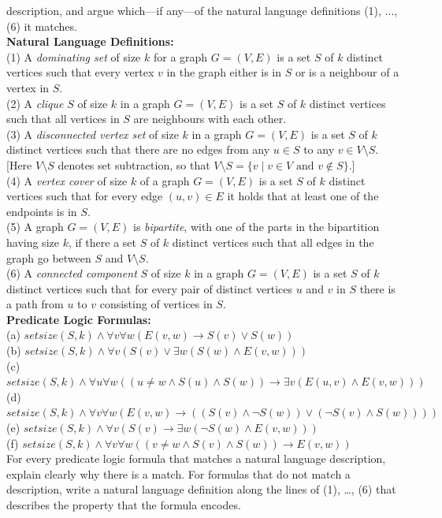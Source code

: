 \documentclass[a4paper,12pt]{article}
\begin{document}
{description, and argue which—if any—of the natural language definitions (1), $\ldots$, (6) it matches.\\
\n
\textbf{Natural Language Definitions:}\\
\n
(1) A \emph{dominating set} of size $k$ for a graph $G = (V, E)$ is a set $S$ of $k$ distinct vertices such that every vertex $v$ in the graph either is in $S$ or is a neighbour of a vertex in $S$.\\
\n
(2) A \emph{clique} $S$ of size $k$ in a graph $G = (V, E)$ is a set $S$ of $k$ distinct vertices such that all vertices in $S$ are neighbours with each other.\\
\n
(3) A \emph{disconnected vertex set} of size $k$ in a graph $G = (V, E)$ is a set $S$ of $k$ distinct vertices such that there are no edges from any $u \in S$ to any $v \in V \setminus S$. [Here $V \setminus S$ denotes set subtraction, so that $V \setminus S = \{v \mid v \in V \text{ and } v \not\in S\}$.]\\
\n
(4) A \emph{vertex cover} of size $k$ of a graph $G = (V, E)$ is a set $S$ of $k$ distinct vertices such that for every edge $(u, v) \in E$ it holds that at least one of the endpoints is in $S$.\\
\n
(5) A graph $G = (V, E)$ is \emph{bipartite}, with one of the parts in the bipartition having size $k$, if there a set $S$ of $k$ distinct vertices such that all edges in the graph go between $S$ and $V \setminus S$.\\
\n
(6) A \emph{connected component} $S$ of size $k$ in a graph $G = (V, E)$ is a set $S$ of $k$ distinct vertices such that for every pair of distinct vertices $u$ and $v$ in $S$ there is a path from $u$ to $v$ consisting of vertices in $S$.\\
\n
\textbf{Predicate Logic Formulas:}\\
\n
(a) $setsize(S, k) \wedge \forall v \forall w \left(E(v, w) \rightarrow S(v) \vee S(w)\right)$\\
\n
(b) $setsize(S, k) \wedge \forall v \left(S(v) \vee \exists w(S(w) \wedge E(v, w))\right)$\\
\n
(c) $setsize(S, k) \wedge \forall u \forall w\left((u \neq w \wedge S(u) \wedge S(w)) \rightarrow \exists v(E(u, v) \wedge E(v, w))\right)$\\
\n
(d) $setsize(S, k) \wedge \forall v \forall w\left(E(v, w) \rightarrow ((S(v) \wedge \neg S(w)) \vee (\neg S(v) \wedge S(w)))\right)$\\
\n
(e) $setsize(S, k) \wedge \forall v\left(S(v) \rightarrow \exists w(\neg S(w) \wedge E(v, w))\right)$\\
\n
(f) $setsize(S, k) \wedge \forall v \forall w\left((v \neq w \wedge S(v) \wedge S(w)) \rightarrow E(v, w)\right)$\\
\n
For every predicate logic formula that matches a natural language description, explain clearly why there is a match. For formulas that do not match a description, write a natural language definition along the lines of (1), \ldots, (6) that describes the property that the formula encodes.}
\end{document}
